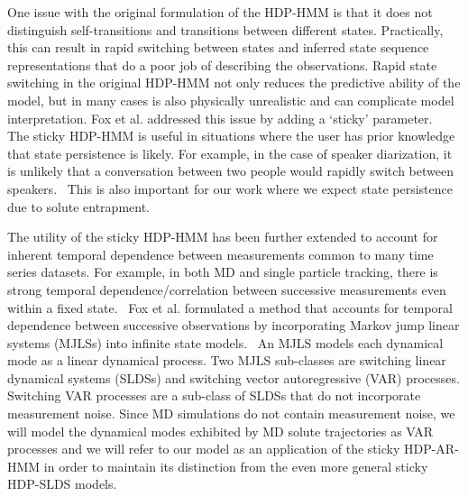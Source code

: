 \documentclass[journal=jpcbfk,manuscript=article]{achemso}
\begin{document}
  One issue with the original formulation of the HDP-HMM is that it does 
  not distinguish self-transitions and transitions between different states.
  Practically, this can result in rapid switching between states and inferred
  state sequence representations that do a poor job of describing the 
  observations. Rapid state switching in the original HDP-HMM not only 
  reduces the predictive ability of the model, but in many cases is also 
  physically unrealistic and can complicate model interpretation. 
  Fox et al. addressed this issue by adding a `sticky'
  parameter.~\cite{fox_sticky_2007} The sticky HDP-HMM is useful in situations
  where the user has prior knowledge that state persistence is likely.
  For example, in the case of speaker diarization, it is unlikely that a 
  conversation between two people would rapidly switch between speakers.~\cite{fox_sticky_2011}
  This is also important for our work where we expect state persistence due
  to solute entrapment.   
  
  The utility of the sticky HDP-HMM has been further extended to account for
  inherent temporal dependence between measurements common to many time series
  datasets. For example, in both MD and single particle tracking, there is 
  strong temporal dependence/correlation between successive measurements even
  within a fixed state.~\cite{calderon_data-driven_2014}
  Fox et al. formulated a method that accounts for temporal dependence between
  successive observations by incorporating Markov jump linear systems (MJLSs)
  into infinite state models.~\cite{fox_nonparametric_2009} An MJLS models 
  each dynamical mode as a linear dynamical process. Two MJLS sub-classes are 
  switching linear dynamical systems (SLDSs) and switching vector autoregressive
  (VAR) processes. Switching VAR processes are a sub-class of SLDSs that do not
  incorporate measurement noise. Since MD simulations do not contain measurement
  noise, we will model the dynamical modes exhibited by MD solute trajectories 
  as VAR processes and we will refer to our model as an application of the 
  sticky HDP-AR-HMM in order to maintain its distinction from the even more
  general sticky HDP-SLDS models.
  
\end{document}
